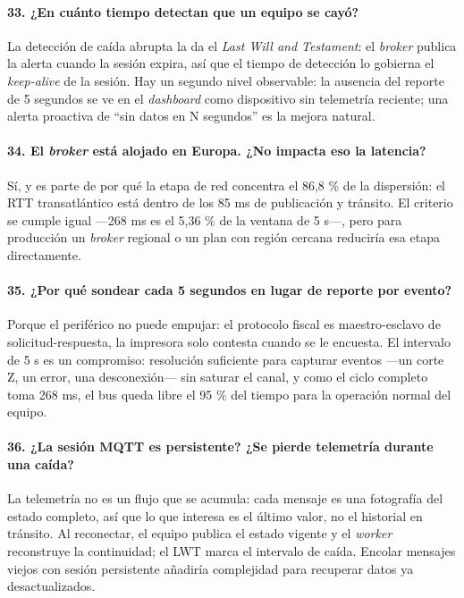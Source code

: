 \documentclass[11pt, a4paper]{article}
\begin{document}
\paragraph{33. ¿En cuánto tiempo detectan que un equipo se cayó?}
La detección de caída abrupta la da el \textit{Last Will and Testament}: el \textit{broker} publica la alerta cuando la sesión expira, así que el tiempo de detección lo gobierna el \textit{keep-alive} de la sesión. Hay un segundo nivel observable: la ausencia del reporte de 5 segundos se ve en el \textit{dashboard} como dispositivo sin telemetría reciente; una alerta proactiva de ``sin datos en N segundos'' es la mejora natural.

\paragraph{34. El \textit{broker} está alojado en Europa. ¿No impacta eso la latencia?}
Sí, y es parte de por qué la etapa de red concentra el 86,8 \% de la dispersión: el RTT transatlántico está dentro de los 85 ms de publicación y tránsito. El criterio se cumple igual —268 ms es el 5,36 \% de la ventana de 5 s—, pero para producción un \textit{broker} regional o un plan con región cercana reduciría esa etapa directamente.

\paragraph{35. ¿Por qué sondear cada 5 segundos en lugar de reporte por evento?}
Porque el periférico no puede empujar: el protocolo fiscal es maestro-esclavo de solicitud-respuesta, la impresora solo contesta cuando se le encuesta. El intervalo de 5 s es un compromiso: resolución suficiente para capturar eventos —un corte Z, un error, una desconexión— sin saturar el canal, y como el ciclo completo toma 268 ms, el bus queda libre el 95 \% del tiempo para la operación normal del equipo.

\paragraph{36. ¿La sesión MQTT es persistente? ¿Se pierde telemetría durante una caída?}
La telemetría no es un flujo que se acumula: cada mensaje es una fotografía del estado completo, así que lo que interesa es el último valor, no el historial en tránsito. Al reconectar, el equipo publica el estado vigente y el \textit{worker} reconstruye la continuidad; el LWT marca el intervalo de caída. Encolar mensajes viejos con sesión persistente añadiría complejidad para recuperar datos ya desactualizados.
\end{document}
